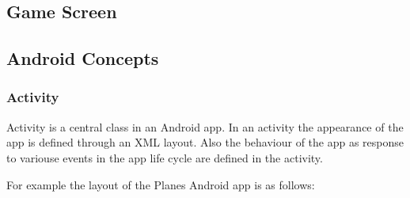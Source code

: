 \subsection{Game Screen}



\subsection { Android Concepts }

\subsubsection { Activity }

Activity is a central class in an Android app. In an activity the appearance of the app is defined through an XML layout. Also the behaviour of the app as response to variouse events in the app life cycle are defined in the activity.

For example the layout of the Planes Android app is as follows:

